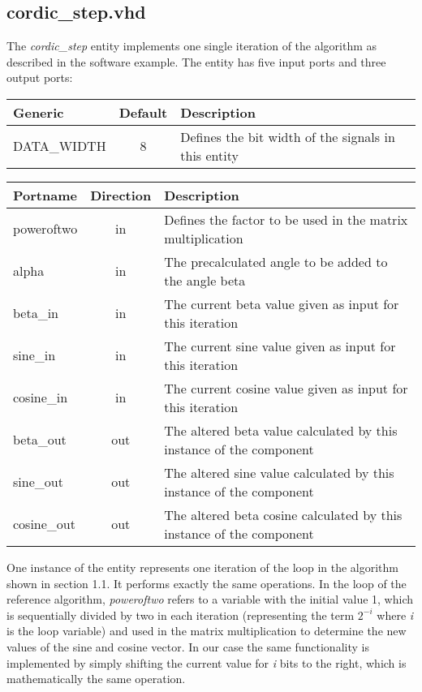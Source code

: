 \subsection{cordic\_step.vhd}

The \textit{cordic\_step} entity implements one single iteration of the algorithm as described in the software example. The entity has five input ports and three output ports:

\begin{center}
	\begin{tabular}{ | l | c | l | }
		\hline
		\textbf{Generic} & \textbf{Default} & \textbf{Description} \\
		\hline
		DATA\_WIDTH & 8 & Defines the bit width of the signals in this entity \\
		\hline
	\end{tabular} 
\end{center}

\begin{center}
	\begin{tabular}{ | l | c | l | }
		\hline
		\textbf{Portname} & \textbf{Direction} & \textbf{Description} \\
		\hline
		poweroftwo & in & Defines the factor to be used in the matrix multiplication \\
		alpha & in  & The precalculated angle to be added to the angle beta \\
		beta\_in & in  & The current beta value given as input for this iteration \\
		sine\_in & in  & The current sine value given as input for this iteration \\
		cosine\_in & in  & The current cosine value given as input for this iteration \\
		beta\_out & out  & The altered beta value calculated by this instance of the component \\
		sine\_out & out  & The altered sine value calculated by this instance of the component \\
		cosine\_out & out  & The altered beta cosine calculated by this instance of the component \\
		\hline
	\end{tabular} 
\end{center}

One instance of the entity represents one iteration of the loop in the algorithm shown in section 1.1. It performs exactly the same operations. In the loop of the reference algorithm, \textit{poweroftwo} refers to a variable with the initial value 1, which is sequentially divided by two in each iteration (representing the term \(2^{-i}\) where \textit{i} is the loop variable) and used in the matrix multiplication to determine the new values of the sine and cosine vector. In our case the same functionality is implemented by simply shifting the current value for \textit{i} bits to the right, which is mathematically the same operation.

